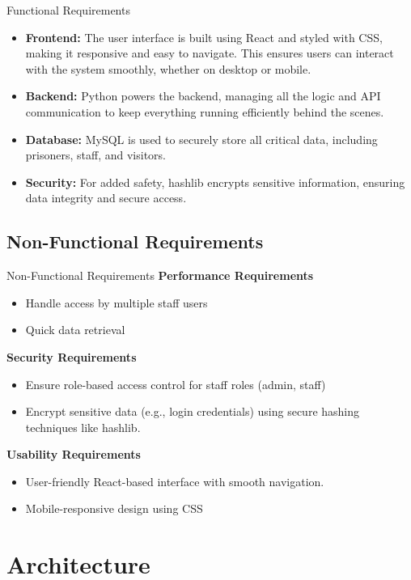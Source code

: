 \documentclass[aspectratio=169]{beamer}
\begin{document}
\begin{frame}{Functional Requirements}
    \begin{itemize}
        \item \textbf{Frontend:} The user interface is built using React and styled with CSS, making it responsive and easy to navigate. This ensures users can interact with the system smoothly, whether on desktop or mobile.
        \item \textbf{Backend:} Python powers the backend, managing all the logic and API communication to keep everything running efficiently behind the scenes.
        \item \textbf{Database:} MySQL is used to securely store all critical data, including prisoners, staff, and visitors.
        \item \textbf{Security:} For added safety, hashlib encrypts sensitive information, ensuring data integrity and secure access.
    \end{itemize}
\end{frame}
\subsection{Non-Functional Requirements}
\begin{frame}{Non-Functional Requirements}
    \textbf{Performance Requirements}
    \begin{itemize}
        \item Handle access by multiple staff users 
        \item Quick data retrieval 
    \end{itemize}
    \textbf{Security Requirements}
    \begin{itemize}
        \item Ensure role-based access control for staff roles (admin, staff)
        \item Encrypt sensitive data (e.g., login credentials) using secure hashing techniques like hashlib.
    \end{itemize}
    \textbf{Usability Requirements}
    \begin{itemize}
        \item User-friendly React-based interface with smooth navigation.
        \item Mobile-responsive design using CSS
    \end{itemize}
    
\end{frame}
\section{Architecture}
\end{document}
